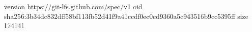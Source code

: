 version https://git-lfs.github.com/spec/v1
oid sha256:3b34dc832dff58bf113fb52d41f9a41ccdf0ec0cd9360a5c943516b9cc5395ff
size 174141
